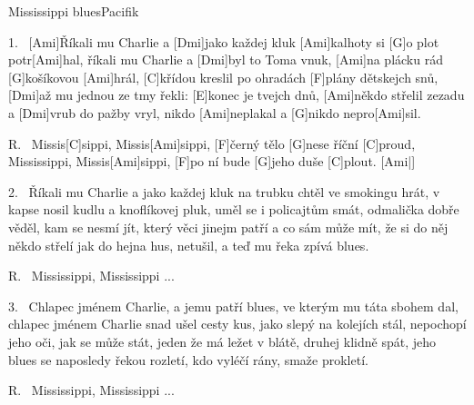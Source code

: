 \begin{song}{Mississippi blues}{Pacifik}


\begin{xverse}{1.~}
[Ami]{Ří}kali mu Charlie a [Dmi]jako každej kluk
[Ami]kalhoty si [G]o plot potr[Ami]hal,
říkali mu Charlie a [Dmi]byl to Toma vnuk,
[Ami]na plácku rád [G]košíkovou [Ami]hrál,
[C]křídou kreslil po ohradách [F]plány dětskejch snů,
[Dmi]až mu jednou ze tmy řekli: [E]konec je tvejch dnů,
[Ami]někdo střelil zezadu a [Dmi]vrub do pažby vryl,
nikdo [Ami]neplakal a [G]nikdo nepro[Ami]sil.
\end{xverse}


\begin{xverse}{R.~}
Missis[C]sippi, Missis[Ami]sippi, [F]{čer}ný tělo [G]nese říční [C]proud,
Mississippi, Missis[Ami]sippi, [F]po ní bude [G]jeho duše [C]plout. [Ami|]{}
\end{xverse}


\begin{xverse}{2.~}
Říkali mu Charlie a jako každej kluk
na trubku chtěl ve smokingu hrát,
v kapse nosil kudlu a knoflíkovej pluk,
uměl se i policajtům smát,
odmalička dobře věděl, kam se nesmí jít,
který věci jinejm patří a co sám může mít,
že si do něj někdo střelí jak do hejna hus,
netušil, a teď mu řeka zpívá blues.

\end{xverse}

\begin{xverse}{R.~}
Mississippi, Mississippi ...
\end{xverse}


\begin{xverse}{3.~}
Chlapec jménem Charlie, a jemu patří blues,
ve kterým mu táta sbohem dal,
chlapec jménem Charlie snad ušel cesty kus,
jako slepý na kolejích stál,
nepochopí jeho oči, jak se může stát,
jeden že má ležet v blátě, druhej klidně spát,
jeho blues se naposledy řekou rozletí,
kdo vyléčí rány, smaže prokletí.
\end{xverse}

\begin{xverse}{R.~}
Mississippi, Mississippi ...
\end{xverse}

\end{song}

